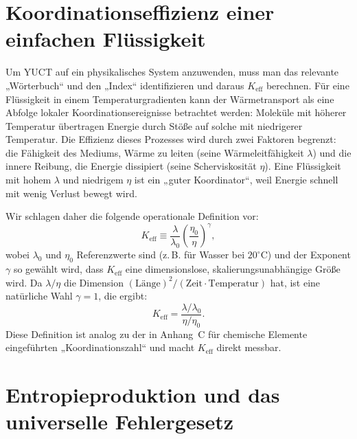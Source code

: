 \documentclass[12pt,a4paper]{article}
\begin{document}
	\section{Koordinationseffizienz einer einfachen Flüssigkeit}
	
	Um YUCT auf ein physikalisches System anzuwenden, muss man das relevante „Wörterbuch“ und den „Index“ identifizieren und daraus \(K_{\mathrm{eff}}\) berechnen. Für eine Flüssigkeit in einem Temperaturgradienten kann der Wärmetransport als eine Abfolge lokaler Koordinationsereignisse betrachtet werden: Moleküle mit höherer Temperatur übertragen Energie durch Stöße auf solche mit niedrigerer Temperatur. Die Effizienz dieses Prozesses wird durch zwei Faktoren begrenzt: die Fähigkeit des Mediums, Wärme zu leiten (seine Wärmeleitfähigkeit \(\lambda\)) und die innere Reibung, die Energie dissipiert (seine Scherviskosität \(\eta\)). Eine Flüssigkeit mit hohem \(\lambda\) und niedrigem \(\eta\) ist ein „guter Koordinator“, weil Energie schnell mit wenig Verlust bewegt wird.
	
	Wir schlagen daher die folgende operationale Definition vor:
	\begin{equation}\label{eq:Keff-fluid}
		K_{\mathrm{eff}} \equiv \frac{\lambda}{\lambda_0} \left( \frac{\eta_0}{\eta} \right)^{\gamma},
	\end{equation}
	wobei \(\lambda_0\) und \(\eta_0\) Referenzwerte sind (z. B. für Wasser bei \(20^\circ\)C) und der Exponent \(\gamma\) so gewählt wird, dass \(K_{\mathrm{eff}}\) eine dimensionslose, skalierungsunabhängige Größe wird. Da \(\lambda/\eta\) die Dimension \((\mathrm{Länge})^2/(\mathrm{Zeit}\cdot\mathrm{Temperatur})\) hat, ist eine natürliche Wahl \(\gamma = 1\), die ergibt:
	\begin{equation}\label{eq:Keff-fluid2}
		K_{\mathrm{eff}} = \frac{\lambda / \lambda_0}{\eta / \eta_0}.
	\end{equation}
	Diese Definition ist analog zu der in Anhang~C für chemische Elemente eingeführten „Koordinationszahl“ und macht \(K_{\mathrm{eff}}\) direkt messbar.
	
	\section{Entropieproduktion und das universelle Fehlergesetz}
	
\end{document}
